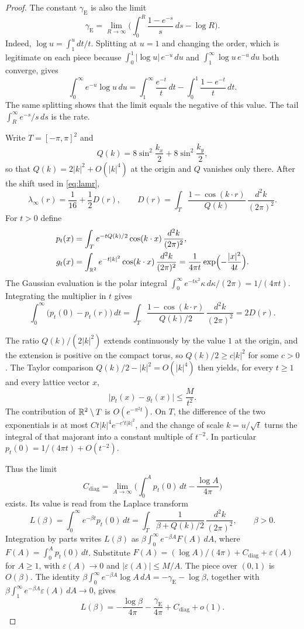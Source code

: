 \begin{proof}
The constant \(\gamma_{\mathrm{E}}\) is also the limit
\[
\gamma_{\mathrm{E}}
=\lim_{R\to\infty}
\Biggl(
\int_0^R\frac{1-e^{-s}}{s}\,ds-\log R
\Biggr).
\]
Indeed, \(\log u=\int_1^u dt/t\).
Splitting at \(u=1\) and changing the order, which is legitimate on each
piece because \(\int_0^1|\log u|\,e^{-u}\,du\) and
\(\int_1^\infty\log u\,e^{-u}\,du\) both converge, gives
\[
\int_0^\infty e^{-u}\log u\,du
=\int_1^\infty\frac{e^{-t}}{t}\,dt
-\int_0^1\frac{1-e^{-t}}{t}\,dt.
\]
The same splitting shows that the limit equals the negative of this value.
The tail \(\int_R^\infty e^{-s}/s\,ds\) is the rate.

Write \(T=[-\pi,\pi]^2\) and
\[
Q(k)=8\sin^2\frac{k_x}{2}+8\sin^2\frac{k_y}{2},
\]
so that \(Q(k)=2|k|^2+O(|k|^4)\) at the origin and \(Q\) vanishes only there.
After the shift used in \eqref{eq:lamr},
\[
\lambda_\infty(r)
=\frac1{16}+\frac12 D(r),
\qquad
D(r)
=\int_T\frac{1-\cos(k\cdot r)}{Q(k)}\,\frac{d^2k}{(2\pi)^2}.
\]
For \(t>0\) define
\begin{align*}
p_t(x)
&=\int_T e^{-t Q(k)/2}\cos(k\cdot x)\,\frac{d^2k}{(2\pi)^2},\\
g_t(x)
&=\int_{\mathbb{R}^2} e^{-t|k|^2}\cos(k\cdot x)\,\frac{d^2k}{(2\pi)^2}
=\frac{1}{4\pi t}\exp\Bigl(-\frac{|x|^2}{4t}\Bigr).
\end{align*}
The Gaussian evaluation is the polar integral
\(\int_0^\infty e^{-t\kappa^2}\kappa\,d\kappa/(2\pi)=1/(4\pi t)\).
Integrating the multiplier in \(t\) gives
\[
\int_0^\infty\bigl(p_t(0)-p_t(r)\bigr)\,dt
=\int_T\frac{1-\cos(k\cdot r)}{Q(k)/2}\,\frac{d^2k}{(2\pi)^2}
=2D(r).
\]

The ratio \(Q(k)/(2|k|^2)\) extends continuously by the value \(1\) at the origin,
and the extension is positive on the compact torus, so
\(Q(k)/2\ge c|k|^2\) for some \(c>0\).
The Taylor comparison \(Q(k)/2-|k|^2=O(|k|^4)\) then yields, for every \(t\ge 1\)
and every lattice vector \(x\),
\[
\bigl|p_t(x)-g_t(x)\bigr|\le\frac{M}{t^2}.
\]
The contribution of \(\mathbb{R}^2\setminus T\) is \(O(e^{-\pi^2 t})\).
On \(T\), the difference of the two exponentials is at most
\(C t|k|^4 e^{-c't|k|^2}\), and the change of scale \(k=u/\sqrt{t}\) turns the
integral of that majorant into a constant multiple of \(t^{-2}\).
In particular \(p_t(0)=1/(4\pi t)+O(t^{-2})\).

Thus the limit
\[
C_{\mathrm{diag}}
=\lim_{A\to\infty}
\Biggl(\int_0^A p_t(0)\,dt-\frac{\log A}{4\pi}\Biggr)
\]
exists.
Its value is read from the Laplace transform
\[
L(\beta)
=\int_0^\infty e^{-\beta t}p_t(0)\,dt
=\int_T\frac{1}{\beta+Q(k)/2}\,\frac{d^2k}{(2\pi)^2},
\qquad\beta>0.
\]
Integration by parts writes \(L(\beta)\) as
\(\beta\int_0^\infty e^{-\beta A}F(A)\,dA\), where \(F(A)=\int_0^A p_t(0)\,dt\).
Substitute \(F(A)=(\log A)/(4\pi)+C_{\mathrm{diag}}+\varepsilon(A)\) for \(A\ge 1\),
with \(\varepsilon(A)\to 0\) and \(|\varepsilon(A)|\le M/A\).
The piece over \((0,1)\) is \(O(\beta)\).
The identity
\(\beta\int_0^\infty e^{-\beta A}\log A\,dA=-\gamma_{\mathrm{E}}-\log\beta\),
together with \(\beta\int_1^\infty e^{-\beta A}\varepsilon(A)\,dA\to 0\), gives
\[
L(\beta)
=-\frac{\log\beta}{4\pi}
-\frac{\gamma_{\mathrm{E}}}{4\pi}
+C_{\mathrm{diag}}+o(1).
\]


\end{proof}
